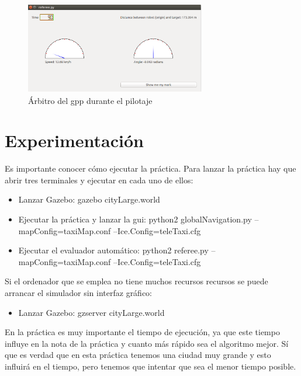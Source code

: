 \begin{figure}[H]
  \begin{center}
    \includegraphics[width=0.7\textwidth]{figures/GPP/referee2_gpp.png}
		\caption{Árbitro del \acrshort{gpp} durante el pilotaje}
		\label{fig.referee2_gpp}
		\end{center}
\end{figure}


\section{Experimentación}
Es importante conocer cómo ejecutar la práctica. Para lanzar la práctica hay que abrir tres terminales y ejecutar en cada uno de ellos:

\begin{itemize}
\item Lanzar Gazebo: gazebo cityLarge.world
\item	Ejecutar la práctica y lanzar la \acrshort{gui}: python2 globalNavigation.py --mapConfig=taxiMap.conf --Ice.Config=teleTaxi.cfg
\item	Ejecutar el evaluador automático: python2 referee.py --mapConfig=taxiMap.conf --Ice.Config=teleTaxi.cfg
\end{itemize}

Si el ordenador que se emplea no tiene muchos recursos recursos se puede arrancar el simulador sin interfaz gráfico:

\begin{itemize}
\item Lanzar Gazebo: gzserver cityLarge.world
\end{itemize}

En la práctica es muy importante el tiempo de ejecución, ya que este tiempo influye en la nota de la práctica y cuanto más rápido sea el algoritmo mejor. Sí que es verdad que en esta práctica tenemos una ciudad muy grande y esto influirá en el tiempo, pero tenemos que intentar que sea el menor tiempo posible.\\


